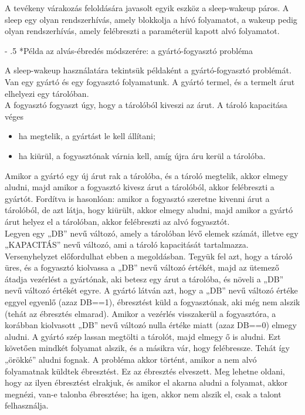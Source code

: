 \documentclass[tikz,12pt,margin=0px]{article}
\makeatletter
\renewcommand\paragraph{%
	\@startsection{paragraph}{4}{0mm}%
	{-\baselineskip}%
	{.5\baselineskip}%
	{\normalfont\normalsize\bfseries}}
\makeatother
\begin{document}
    \noindent A tevékeny várakozás feloldására javasolt egyik eszköz a sleep-wakeup páros. A sleep egy olyan rendszerhívás, amely blokkolja a hívó folyamatot, a wakeup pedig olyan rendszerhívás, amely felébreszti a paraméterül kapott alvó folyamatot.

    \paragraph*{Példa az alvás-ébredés módszerére: a gyártó-fogyasztó probléma}

    A sleep-wakeup használatára tekintsük példaként a gyártó-fogyasztó problémát. Van egy gyártó és egy fogyasztó folyamatunk. A gyártó termel, és a termelt árut elhelyezi egy tárolóban.\\ A fogyasztó fogyaszt úgy, hogy a tárolóból kiveszi az árut. A tároló kapacitása véges
    \begin{itemize}
        \item ha megtelik, a gyártást le kell állítani;
        \item ha kiürül, a fogyasztónak várnia kell, amíg újra áru kerül a tárolóba.
    \end{itemize}

    \noindent Amikor a gyártó egy új árut rak a tárolóba, és a tároló megtelik, akkor elmegy aludni, majd amikor a fogyasztó kivesz árut a tárolóból, akkor felébreszti a gyártót. Fordítva is hasonlóan: amikor a fogyasztó szeretne kivenni árut a tárolóból, de azt látja, hogy kiürült, akkor elmegy aludni, majd amikor a gyártó árut helyez el a tárolóban, akkor felébreszti az alvó fogyasztót.\\

    \noindent Legyen egy „DB” nevű változó, amely a tárolóban lévő elemek számát, illetve egy „KAPACITÁS” nevű változó, ami a tároló kapacitását tartalmazza.\\

    \noindent Versenyhelyzet előfordulhat ebben a megoldásban. Tegyük fel azt, hogy a tároló üres, és a fogyasztó kiolvassa a „DB” nevű változó értékét, majd az ütemező átadja vezérlést a gyártónak, aki betesz egy árut a tárolóba, és növeli a „DB” nevű változó értékét egyre. A gyártó látván azt, hogy a „DB” nevű változó értéke eggyel egyenlő (azaz DB==1), ébresztést küld a fogyasztónak, aki még nem alszik (tehát az ébresztés elmarad). Amikor a vezérlés visszakerül a fogyasztóra, a korábban kiolvasott „DB” nevű változó nulla értéke miatt (azaz DB==0) elmegy aludni. A gyártó szép lassan megtölti a tárolót, majd elmegy ő is aludni. Ezt követően mindkét folyamat alszik, és a másikra vár, hogy felébressze. Tehát így „örökké” aludni fognak. A probléma akkor történt, amikor a nem alvó folyamatnak küldtek ébresztést. Ez az ébresztés elveszett. Meg lehetne oldani, hogy az ilyen ébresztést elrakjuk, és amikor el akarna aludni a folyamat, akkor megnézi, van-e talonba ébresztése; ha igen, akkor nem alszik el, csak a talont felhasználja.
\end{document}
